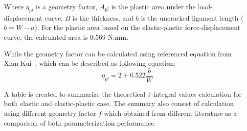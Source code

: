 \documentclass[12pt]{article}
\begin{document}
Where $\eta_{pl}$ is a geometry factor, $A_{pl}$ is the plastic area under the load-displacement curve, $B$ is the thickness, and $b$ is the uncracked ligament length ($b = W - a$). 
For the plastic area based on the elastic-plastic force-displacement curve, the calculated area is 0.569 N.mm.


\hspace{1em}While the geometry factor can be calculated using referenced equation from Xian-Kui~\cite{Zhu.2012}, which can be described as following equation:
\begin{equation}
    \eta_{pl} = 2 + 0.522 \frac{b}{W}
    \label{eq:GeometryFactor}
\end{equation}

A table is created to summarize the theoretical J-integral values calculation for both elastic and elastic-plastic case. The summary also consist of calculation using
different geometry factor $f$ which obtained from different literature as a comparison of both parameterization performance.

\begin{table}[H]
\centering
\caption{Theoretical J-integral value calculation summary for elastic and elastic-plastic case}
\label{tab:JIntegralCalculation1}
\end{table}

\begin{table}[H]
\centering
\caption{Final results of the theoretical J-integral value calculation summary for elastic and elastic-plastic case (continue from table~\ref{tab:JIntegralCalculation1}).}
\label{tab:JIntegralCalculation2}
\end{table}
\end{document}

